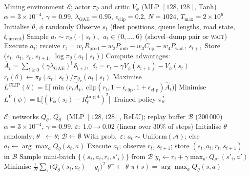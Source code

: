 \documentclass[11pt,a4paper]{article}
\begin{document}
\begin{algorithm}[H]
\caption{PPO for mining truck dispatching}
\label{alg:ppo}
\begin{algorithmic}[1]
\Require Mining environment $\mathcal{E}$; actor $\pi_\theta$ and critic $V_\phi$ (MLP $[128,128]$, Tanh)
\Require $\alpha{=}3{\times}10^{-4}$, $\gamma{=}0.99$, $\lambda_{\text{GAE}}{=}0.95$, $\epsilon_{\text{clip}}{=}0.2$, $N{=}1024$, $T_{\max}{=}2{\times}10^6$
\State Initialise $\theta$, $\phi$ randomly
   
    \State Observe $s_t$ (fleet positions, queue lengths, road state, $t_{\text{current}}$)
    \State Sample $a_t \sim \pi_\theta(\cdot\mid s_t)$, $\;a_t\in\{0,\ldots,6\}$ (shovel--dump pair or \textsc{wait})
    \State Execute $a_t$; receive $r_t = w_1 R_{\text{prod}} - w_2 P_{\text{imb}} - w_3 C_{\text{op}} - w_4 P_{\text{wait}}$, $s_{t+1}$
    \State Store $\bigl(s_t,\,a_t,\,r_t,\,s_{t+1},\,\log\pi_\theta(a_t\mid s_t)\bigr)$
  \EndFor
  \State Compute advantages: $\hat{A}_t = \sum_{l\geq 0}(\gamma\lambda_{\text{GAE}})^l\,\delta_{t+l}$,
         $\;\delta_t = r_t + \gamma V_\phi(s_{t+1}) - V_\phi(s_t)$
    \State $r_t(\theta)\leftarrow \pi_\theta(a_t\mid s_t)/\pi_{\theta_k}(a_t\mid s_t)$
    \State Maximise $L^{\text{CLIP}}(\theta)=\mathbb{E}\bigl[\min\bigl(r_t\hat{A}_t,\;\mathrm{clip}(r_t,1{-}\epsilon_{\text{clip}},1{+}\epsilon_{\text{clip}})\hat{A}_t\bigr)\bigr]$
    \State Minimise $L^{V}(\phi)=\mathbb{E}\bigl[(V_\phi(s_t)-R_t^{\text{target}})^2\bigr]$
  \EndFor
\EndFor
\Ensure Trained policy $\pi_\theta^*$
\end{algorithmic}
\end{algorithm}

\begin{algorithm}[H]
\caption{DQN for mining truck dispatching}
\label{alg:dqn}
\begin{algorithmic}[1]
\Require $\mathcal{E}$; networks $Q_\theta$, $Q_{\theta^-}$ (MLP $[128,128]$, ReLU); replay buffer $\mathcal{B}$ (200\,000)
\Require $\alpha{=}3{\times}10^{-4}$, $\gamma{=}0.99$, $\varepsilon{:}\;1.0\!\to\!0.02$ (linear over $30\%$ of steps)
\State Initialise $\theta$ randomly; $\theta^-\leftarrow\theta$; $\mathcal{B}\leftarrow\emptyset$
  \State With prob.\ $\varepsilon$: $a_t\sim\text{Uniform}(\mathcal{A})$; else $a_t\leftarrow\arg\max_a Q_\theta(s_t,a)$
  \State Execute $a_t$; observe $r_t$, $s_{t+1}$; store $(s_t,a_t,r_t,s_{t+1})$ in $\mathcal{B}$
  \State Sample mini-batch $\{(s_i,a_i,r_i,s'_i)\}$ from $\mathcal{B}$
  \State $y_i \leftarrow r_i + \gamma\max_{a'}Q_{\theta^-}(s'_i,a')$ 
  \State Minimise $\frac{1}{B}\sum_i\bigl(Q_\theta(s_i,a_i)-y_i\bigr)^2$
   $\theta^-\leftarrow\theta$ \EndIf {}
\EndFor
\Ensure $\pi(s)=\arg\max_a Q_\theta(s,a)$
\end{algorithmic}
\end{algorithm}
\end{document}
